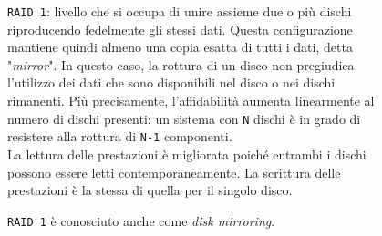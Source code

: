 \begin{itemize}
\begin{figure}[htbp]
\item 
\verb"RAID 1": livello che si occupa di unire assieme due o pi\`{u} dischi riproducendo fedelmente gli stessi dati. Questa configurazione mantiene quindi almeno una copia esatta di tutti i dati, detta "\textit{mirror}". In questo caso, la rottura di un disco non pregiudica l'utilizzo dei dati che sono disponibili nel disco o nei dischi rimanenti. Pi\`{u} precisamente, l'affidabilit\`{a} aumenta linearmente al numero di dischi presenti: un sistema con \verb"N" dischi \`{e} in grado di resistere alla rottura di \verb"N-1" componenti.\\ La lettura delle prestazioni \`{e} migliorata poich\'{e} entrambi i dischi possono essere letti contemporaneamente. La scrittura delle prestazioni \`{e} la stessa di quella per il singolo disco.\cite{etichetta9} 

\verb"RAID 1" \`{e} conosciuto anche come \textit{disk mirroring}.\\


\end{figure}
\end{itemize}

